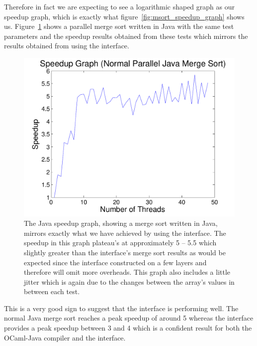 \documentclass[12pt,twoside,notitlepage]{report}
\begin{document}
Therefore in fact we are expecting to see a logarithmic shaped graph as our speedup graph, which is exactly what figure~\ref{fig:msort_speedup_graph} shows us. Figure~\ref{fig:java_speedup_graph} shows a parallel merge sort written
in Java\cite{web:washington} with the same test parameters and the speedup results obtained from these tests which mirrors the results obtained from using the interface.
\begin{figure}[h!]
\includegraphics[width=\linewidth]{java_speedup_graph}
\caption[Parallel Java Merge Sort Speedup Graph]{The Java speedup graph, showing a merge sort written in Java, mirrors exactly what we have achieved by using the interface. The speedup in this graph plateau's at approximately 5 -- 5.5 which slightly greater than the
interface's merge sort results as would be expected since the interface constructed on a few layers and therefore will omit more overheads. This graph also includes a little jitter which is again due to the changes between the array's
values in between each test.}
\label{fig:java_speedup_graph}
\end{figure}
This is a very good sign to suggest that the interface is performing well. The normal Java merge sort reaches a peak speedup of around 5 whereas the interface provides a peak speedup between 3 and 4 which is a confident result for
both the OCaml-Java compiler and the interface. 
\end{document}
